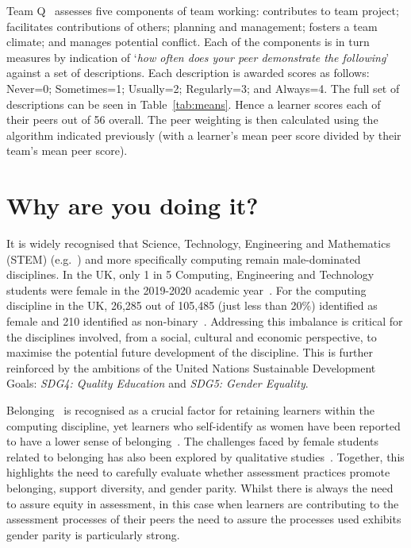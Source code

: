 \documentclass[sigconf, anonymous=false]{acmart}
\begin{document}
Team Q~\cite{Britton2017} assesses five components of team working:
contributes to team project; facilitates contributions of others;
planning and management; fosters a team climate; and manages potential
conflict. Each of the components is in turn measures by indication of
`{\emph{how often does your peer demonstrate the following}}' against
a set of descriptions. Each description is awarded scores as follows:
Never=0; Sometimes=1; Usually=2; Regularly=3; and Always=4. The
full set of descriptions can be seen in Table~\ref{tab:means}. Hence a
learner scores each of their peers out of 56 overall. The peer
weighting is then calculated using the algorithm indicated previously
(with a learner's mean peer score divided by their team's mean peer
score).
\section{Why are you doing it?}
It is widely recognised that Science, Technology, Engineering and
Mathematics (STEM) (e.g.~\cite{Baird2018}) and more specifically
computing remain male-dominated disciplines. In the UK, only 1 in 5
Computing, Engineering and Technology students were female in the
2019-2020 academic year~\cite{HESA}. For the computing discipline in
the UK, 26,285 out of 105,485 (just less than 20\%) identified as
female and 210 identified as non-binary~\cite{HESA}. Addressing this
imbalance is critical for the disciplines involved, from a social,
cultural and economic perspective, to maximise the potential future
development of the discipline. This is further reinforced by the
ambitions of the United Nations Sustainable Development Goals:
{\emph{SDG4: Quality Education}} and {\emph{SDG5: Gender Equality}}.

Belonging~\cite{Veilleux2013} is recognised as a crucial factor for
retaining learners within the computing discipline, yet learners who
self-identify as women have been reported to have a lower sense of
belonging~\cite{Mooney2020}. The challenges faced by female students
related to belonging has also been explored by qualitative
studies~\cite{Winter2021}. Together, this highlights the need to
carefully evaluate whether assessment practices promote belonging,
support diversity, and gender parity. Whilst there is always the need
to assure equity in assessment, in this case when learners are
contributing to the assessment processes of their peers the need to
assure the processes used exhibits gender parity is particularly
strong.
\end{document}
